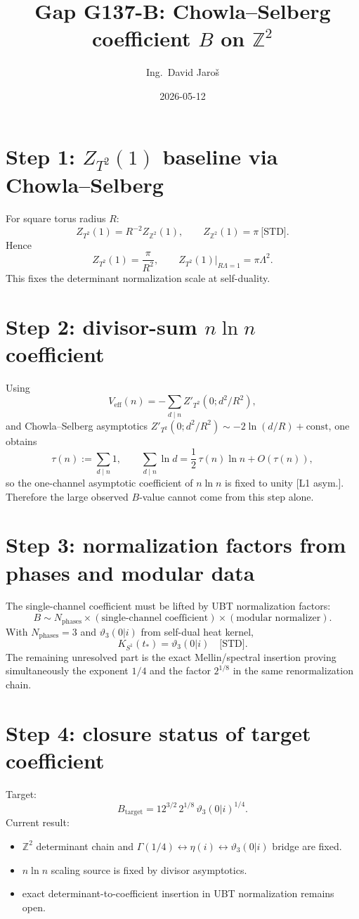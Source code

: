 \documentclass[12pt,a4paper]{article}
\title{Gap G137-B: Chowla--Selberg coefficient $B$ on $\mathbb{Z}^2$}
\author{Ing.\ David Jaroš}
\date{2026-05-12}
\begin{document}
\maketitle

\section{Step 1: \(Z_{T^2}(1)\) baseline via Chowla--Selberg}
For square torus radius \(R\):
\[
Z_{T^2}(1)=R^{-2}Z_{\mathbb{Z}^2}(1),
\qquad Z_{\mathbb{Z}^2}(1)=\pi\ \text{[STD]}.
\]
Hence
\[
Z_{T^2}(1)=\frac{\pi}{R^2},
\qquad
Z_{T^2}(1)\big|_{R\Lambda=1}=\pi\Lambda^2.
\]
This fixes the determinant normalization scale at self-duality.

\section{Step 2: divisor-sum \(n\ln n\) coefficient}
Using
\[
V_{\mathrm{eff}}(n)=-\sum_{d\mid n} Z'_{T^2}(0;d^2/R^2),
\]
and Chowla--Selberg asymptotics
\(Z'_{T^2}(0;d^2/R^2)\sim -2\ln(d/R)+\text{const}\), one obtains
\[
\tau(n):=\sum_{d\mid n}1,
\qquad
\sum_{d\mid n}\ln d = \frac{1}{2}\,\tau(n)\ln n + O(\tau(n)),
\]
so the one-channel asymptotic coefficient of \(n\ln n\) is fixed to unity [L1 asym.].
Therefore the large observed \(B\)-value cannot come from this step alone.

\section{Step 3: normalization factors from phases and modular data}
The single-channel coefficient must be lifted by UBT normalization factors:
\[
B\sim N_{\mathrm{phases}}\times(\text{single-channel coefficient})\times(\text{modular normalizer}).
\]
With \(N_{\mathrm{phases}}=3\) and
\(\vartheta_3(0|i)\) from self-dual heat kernel,
\[
K_{S^1}(t_*)=\vartheta_3(0|i)\quad\text{[STD]}.
\]
The remaining unresolved part is the exact Mellin/spectral insertion proving simultaneously the exponent \(1/4\) and the factor \(2^{1/8}\) in the same renormalization chain.

\section{Step 4: closure status of target coefficient}
Target:
\[
B_{\mathrm{target}}=12^{3/2}\,2^{1/8}\,\vartheta_3(0|i)^{1/4}.
\]
Current result:
\begin{itemize}
  \item \(\mathbb{Z}^2\) determinant chain and \(\Gamma(1/4)\leftrightarrow\eta(i)\leftrightarrow\vartheta_3(0|i)\) bridge are fixed.
  \item \(n\ln n\) scaling source is fixed by divisor asymptotics.
  \item exact determinant-to-coefficient insertion in UBT normalization remains open.
\end{itemize}
\end{document}
